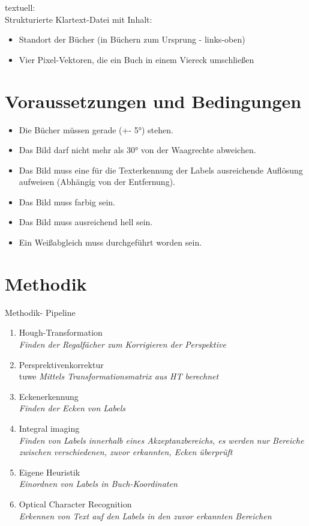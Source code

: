 \documentclass[deutsch]{scrartcl}
\begin{document}
\noindent textuell:\\
Strukturierte Klartext-Datei mit Inhalt:
\begin{itemize}
  \item Standort der Bücher (in Büchern zum Ursprung - links-oben)
  \item Vier Pixel-Vektoren, die ein Buch in einem Viereck umschließen
\end{itemize}

\section{Voraussetzungen und Bedingungen}

\begin{itemize}
  \item Die Bücher müssen gerade (+- 5°) stehen.
  \item Das Bild darf nicht mehr als 30° von der Waagrechte abweichen.
  \item Das Bild muss eine für die Texterkennung der Labels ausreichende Auflösung aufweisen (Abhängig von der Entfernung).
  \item Das Bild muss farbig sein.
  \item Das Bild muss ausreichend hell sein. 
  \item Ein Weißabgleich muss durchgeführt worden sein.
\end{itemize}

\section{Methodik}
Methodik- Pipeline
\begin{enumerate}
	\item Hough-Transformation\\
		\textit{Finden der Regalfächer zum Korrigieren der Perspektive}
	\item Persprektivenkorrektur\\tuwe
		\textit{Mittels Transformationsmatrix aus HT berechnet}
	\item Eckenerkennung\\
		\textit{Finden der Ecken von Labels}
	\item Integral imaging\\
		\textit{Finden von Labels innerhalb eines Akzeptanzbereichs, es werden nur Bereiche zwischen verschiedenen, zuvor erkannten, Ecken überprüft}
	\item Eigene Heuristik\\
		\textit{Einordnen von Labels in Buch-Koordinaten}
	\item Optical Character Recognition\\
		\textit{Erkennen von Text auf den Labels in den zuvor erkannten Bereichen}
\end{enumerate}
\end{document}
